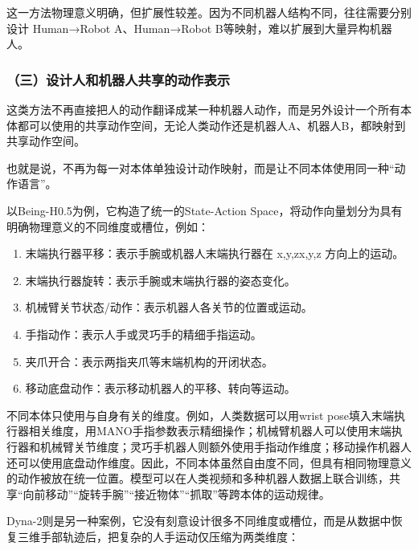 这一方法物理意义明确，但扩展性较差。因为不同机器人结构不同，往往需要分别设计 Human→Robot A、Human→Robot B等映射，难以扩展到大量异构机器人。

\hypertarget{ux4e09ux8bbeux8ba1ux4ebaux548cux673aux5668ux4ebaux5171ux4eabux7684ux52a8ux4f5cux8868ux793a}{%
\subsubsection{（三）设计人和机器人共享的动作表示}\label{ux4e09ux8bbeux8ba1ux4ebaux548cux673aux5668ux4ebaux5171ux4eabux7684ux52a8ux4f5cux8868ux793a}}

这类方法不再直接把人的动作翻译成某一种机器人动作，而是另外设计一个所有本体都可以使用的共享动作空间，无论人类动作还是机器人A、机器人B，都映射到共享动作空间。

也就是说，不再为每一对本体单独设计动作映射，而是让不同本体使用同一种``动作语言''。

以Being-H0.5为例，它构造了统一的State-Action Space，将动作向量划分为具有明确物理意义的不同维度或槽位，例如：

\begin{enumerate}
\def\labelenumi{\arabic{enumi}.}
\item
  末端执行器平移：表示手腕或机器人末端执行器在 x,y,zx,y,z 方向上的运动。
\item
  末端执行器旋转：表示手腕或末端执行器的姿态变化。
\item
  机械臂关节状态/动作：表示机器人各关节的位置或运动。
\item
  手指动作：表示人手或灵巧手的精细手指运动。
\item
  夹爪开合：表示两指夹爪等末端机构的开闭状态。
\item
  移动底盘动作：表示移动机器人的平移、转向等运动。
\end{enumerate}

不同本体只使用与自身有关的维度。例如，人类数据可以用wrist pose填入末端执行器相关维度，用MANO手指参数表示精细操作；机械臂机器人可以使用末端执行器和机械臂关节维度；灵巧手机器人则额外使用手指动作维度；移动操作机器人还可以使用底盘动作维度。因此，不同本体虽然自由度不同，但具有相同物理意义的动作被放在统一位置。模型可以在人类视频和多种机器人数据上联合训练，共享``向前移动''``旋转手腕''``接近物体''``抓取''等跨本体的运动规律。

Dyna-2则是另一种案例，它没有刻意设计很多不同维度或槽位，而是从数据中恢复三维手部轨迹后，把复杂的人手运动仅压缩为两类维度：

